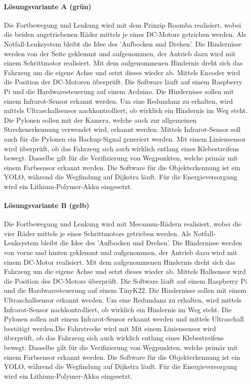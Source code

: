 \documentclass[../main.tex]{subfiles}
\begin{document}
    \paragraph{Lösungsvariante A (grün)}
    Die Fortbewegung und Lenkung wird mit dem Prinzip Roomba realisiert, wobei die beiden angetriebenen Räder mittels je eines DC-Motors getrieben werden. Als Notfall-Lenksystem bleibt die Idee des 'Aufbocken und Drehen'. Die Hindernisse werden von der Seite geklemmt und aufgenommen, der Antrieb dazu wird mit einem Schrittmotor realisiert. Mit dem aufgenommenen Hindernis dreht sich das Fahrzeug um die eigene Achse und setzt dieses wieder ab. Mittels Encoder wird die Position der DC-Motoren überprüft. Die Software läuft auf einem Raspberry Pi und die Hardwaresteuerung auf einem Arduino. Die Hindernisse sollen mit einem Infrarot-Sensor erkannt werden. Um eine Redundanz zu erhalten, wird mittels Ultraschallsensor nachkontrolliert, ob wirklich ein Hindernis im Weg steht. Die Pylonen sollen mit der Kamera, welche auch zur allgemeinen Streckenerkennung verwendet wird, erkannt werden. Mittels Infrarot-Sensor soll auch für die Pylonen ein Backup-Signal generiert werden. Mit einem Liniensensor wird überprüft, ob das Fahrzeug sich auch wirklich entlang eines Klebestreifens bewegt. Dasselbe gilt für die Verifizierung von Wegpunkten, welche primär mit einem Farbsensor erkannt werden. Die Software für die Objekterkennung ist ein YOLO, während die Wegfindung auf Dijkstra läuft. Für die Energieversorgung wird ein Lithium-Polymer-Akku eingesetzt.

    \paragraph{Lösungsvariante B (gelb)}
    Die Fortbewegung und Lenkung wird mit Mecanum-Rädern realisiert, wobei die vier Räder mittels je eines Schrittmotors getrieben werden. Als Notfall-Lenksystem bleibt die Idee des 'Aufbocken und Drehen'. Die Hindernisse werden von vorne und hinten geklemmt und aufgenommen, der Antrieb dazu wird mit einem DC-Motor realisiert. Mit dem aufgenommenen Hindernis dreht sich das Fahrzeug um die eigene Achse und setzt dieses wieder ab. Mittels Hallsensor wird die Position des DC-Motors überprüft. Die Software läuft auf einem Raspberry Pi und die Hardwaresteuerung auf einem TinyK22. Die Hindernisse sollen mit einem Ultraschallsensor erkannt werden. Um eine Redundanz zu erhalten, wird mittels Infrarot-Sensor nachkontrolliert, ob wirklich ein Hindernis im Weg steht. Die Pylonen sollen mit einem Infrarot-Sensor erkannt werden und mittels Ultraschall bestätigt werden.Die Fahrstrecke wird mit  Mit einem Liniensensor wird überprüft, ob das Fahrzeug sich auch wirklich entlang eines Klebestreifens bewegt. Dasselbe gilt für die Verifizierung von Wegpunkten, welche primär mit einem Farbsensor erkannt werden. Die Software für die Objekterkennung ist ein YOLO, während die Wegfindung auf Dijkstra läuft. Für die Energieversorgung wird ein Lithium-Polymer-Akku eingesetzt.
    
\end{document}
